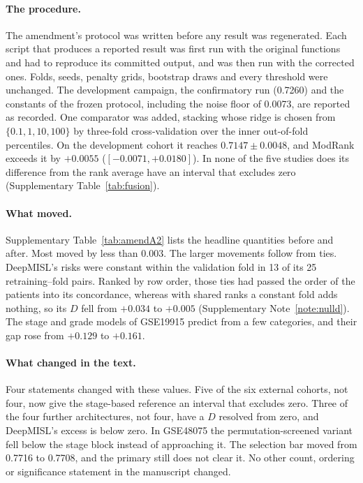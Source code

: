 \documentclass[11pt]{article}
\begin{document}
\paragraph{The procedure.} The amendment's protocol was written before any result was regenerated.
Each script that produces a reported result was first run with the original functions and had to
reproduce its committed output, and was then run with the corrected ones. Folds, seeds, penalty
grids, bootstrap draws and every threshold were unchanged. The development campaign, the
confirmatory run (0.7260) and the constants of the frozen protocol, including the noise floor of
0.0073, are reported as recorded. One comparator was added, stacking whose ridge is chosen from
$\{0.1, 1, 10, 100\}$ by three-fold cross-validation over the inner out-of-fold percentiles. On the
development cohort it reaches $0.7147 \pm 0.0048$, and ModRank exceeds it by $+0.0055$
($[-0.0071, +0.0180]$). In none of the five studies does its difference from the rank average have
an interval that excludes zero (Supplementary Table~\ref{tab:fusion}).

\paragraph{What moved.} Supplementary Table~\ref{tab:amendA2} lists the headline quantities before
and after. Most moved by less than 0.003. The larger movements follow from ties. DeepMISL's risks were
constant within the validation fold in 13 of its 25 retraining--fold pairs. Ranked by row order,
those ties had passed the order of the patients into its concordance, whereas with shared ranks a
constant fold adds nothing, so its $D$ fell from $+0.034$ to $+0.005$ (Supplementary
Note~\ref{note:nulld}). The stage and grade models of GSE19915 predict from a few categories, and
their gap rose from $+0.129$ to $+0.161$.

\paragraph{What changed in the text.} Four statements changed with these values. Five of the six external
cohorts, not four, now give the stage-based reference an interval that excludes zero. Three of the
four further architectures, not four, have a $D$ resolved from zero, and DeepMISL's excess is below
zero. In GSE48075 the permutation-screened variant fell below the stage block instead of approaching
it. The selection bar moved from 0.7716 to 0.7708, and the primary still does not clear it. No other
count, ordering or significance statement in the manuscript changed.
\end{document}
